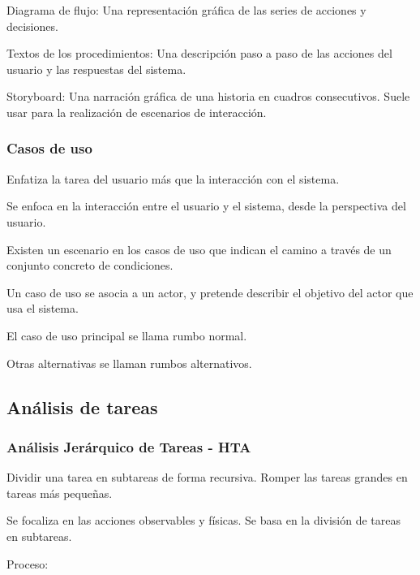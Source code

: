 \documentclass[12pt, twoside, openright]{report} %
\begin{document}
Diagrama de flujo: Una representación gráfica de las series de
acciones y decisiones.

Textos de los procedimientos: Una descripción paso a paso de las
acciones del usuario y las respuestas del sistema.

Storyboard: Una narración gráfica de una historia en cuadros
consecutivos. Suele usar para la realización de escenarios de
interacción.

\subsubsection{Casos de uso}

Enfatiza la tarea del usuario más que la interacción con el
sistema.

Se enfoca en la interacción entre el usuario y el sistema, desde
la perspectiva del usuario.

Existen un escenario en los casos de uso que indican el camino a
través de un conjunto concreto de condiciones.

Un caso de uso se asocia a un actor, y pretende describir el
objetivo del actor que usa el sistema.

El caso de uso principal se llama rumbo normal.

Otras alternativas se llaman rumbos alternativos.
\pagebreak
\subsection{Análisis de tareas}
\subsubsection{Análisis Jerárquico de Tareas - HTA}

Dividir una tarea en
subtareas de forma recursiva. Romper las tareas grandes en tareas
más pequeñas.


Se focaliza en las acciones observables y físicas.
Se basa en la división de tareas en subtareas.

Proceso:
\end{document}
